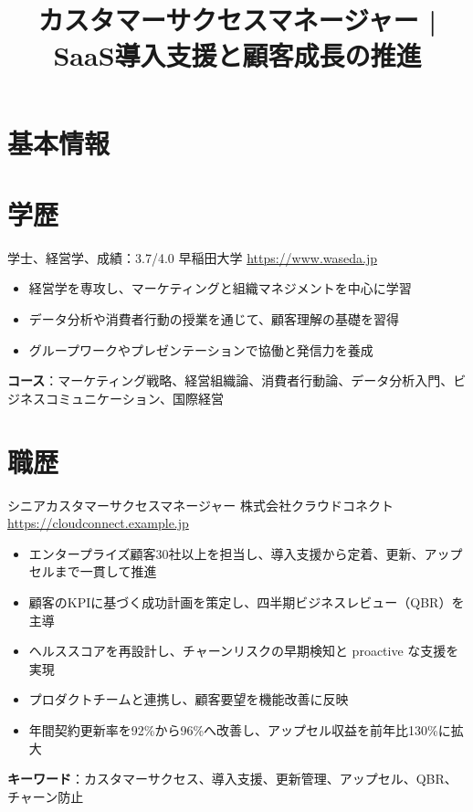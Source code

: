 \documentclass[a4paper, serif, 10pt]{moderncv}
\title{カスタマーサクセスマネージャー | SaaS導入支援と顧客成長の推進}
\begin{document}
\maketitle

\section{基本情報}

\section{学歴}

        {学士、経営学、成績：3.7/4.0}
        {早稲田大学}
        {\url{https://www.waseda.jp}}
        {}
        {\begin{itemize}
\item 経営学を専攻し、マーケティングと組織マネジメントを中心に学習
\item データ分析や消費者行動の授業を通じて、顧客理解の基礎を習得
\item グループワークやプレゼンテーションで協働と発信力を養成
\end{itemize}
\textbf{コース}：マーケティング戦略、経営組織論、消費者行動論、データ分析入門、ビジネスコミュニケーション、国際経営}
\section{職歴}

        {シニアカスタマーサクセスマネージャー}
        {株式会社クラウドコネクト}
        {\url{https://cloudconnect.example.jp}}
        {}
        {\begin{itemize}
\item エンタープライズ顧客30社以上を担当し、導入支援から定着、更新、アップセルまで一貫して推進
\item 顧客のKPIに基づく成功計画を策定し、四半期ビジネスレビュー（QBR）を主導
\item ヘルススコアを再設計し、チャーンリスクの早期検知と proactive な支援を実現
\item プロダクトチームと連携し、顧客要望を機能改善に反映
\item 年間契約更新率を92\%から96\%へ改善し、アップセル収益を前年比130\%に拡大
\end{itemize}
\textbf{キーワード}：カスタマーサクセス、導入支援、更新管理、アップセル、QBR、チャーン防止}
\end{document}
